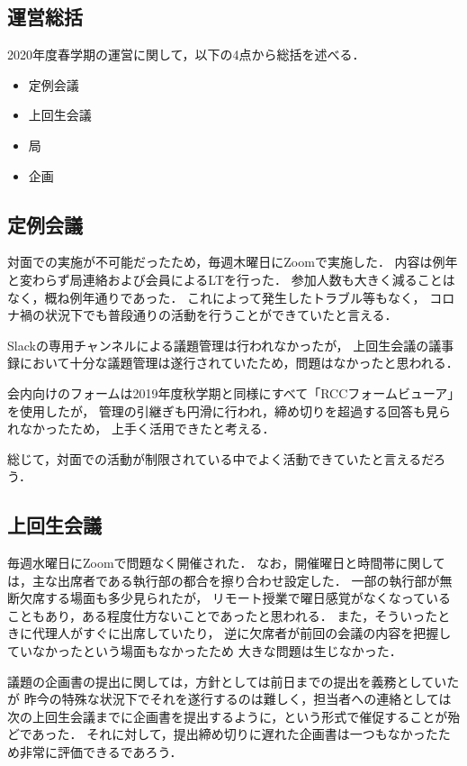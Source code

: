 \subsection*{運営総括}


2020年度春学期の運営に関して，以下の4点から総括を述べる．
\begin{itemize}
  \item 定例会議
  \item 上回生会議
  \item 局
  \item 企画
\end{itemize}

\subsection*{定例会議}
対面での実施が不可能だったため，毎週木曜日にZoomで実施した．
内容は例年と変わらず局連絡および会員によるLTを行った．
参加人数も大きく減ることはなく，概ね例年通りであった．
これによって発生したトラブル等もなく，
コロナ禍の状況下でも普段通りの活動を行うことができていたと言える．

Slackの専用チャンネルによる議題管理は行われなかったが，
上回生会議の議事録において十分な議題管理は遂行されていたため，問題はなかったと思われる．

会内向けのフォームは2019年度秋学期と同様にすべて「RCCフォームビューア」を使用したが，
管理の引継ぎも円滑に行われ，締め切りを超過する回答も見られなかったため，
上手く活用できたと考える．

総じて，対面での活動が制限されている中でよく活動できていたと言えるだろう．

\subsection*{上回生会議}
毎週水曜日にZoomで問題なく開催された．
なお，開催曜日と時間帯に関しては，主な出席者である執行部の都合を擦り合わせ設定した．
一部の執行部が無断欠席する場面も多少見られたが，
リモート授業で曜日感覚がなくなっていることもあり，ある程度仕方ないことであったと思われる．
また，そういったときに代理人がすぐに出席していたり，
逆に欠席者が前回の会議の内容を把握していなかったという場面もなかったため
大きな問題は生じなかった．

議題の企画書の提出に関しては，方針としては前日までの提出を義務としていたが
昨今の特殊な状況下でそれを遂行するのは難しく，担当者への連絡としては
次の上回生会議までに企画書を提出するように，という形式で催促することが殆どであった．
それに対して，提出締め切りに遅れた企画書は一つもなかったため非常に評価できるであろう．

